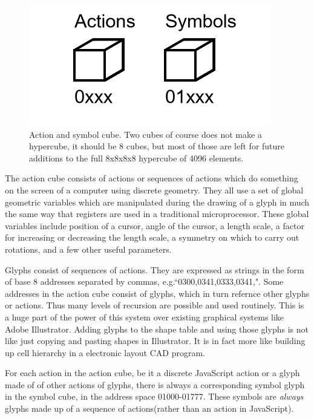 \documentclass[11pt]{article}
\begin{document}
\begin{figure}

\includegraphics[width=\linewidth]{figures/figure1_cubes.png}

\caption{Action and symbol cube. Two cubes of course does not make a hypercube, it should be 8 cubes, but most of those are left for future additions to the full 8x8x8x8 hypercube of 4096 elements.}
\end{figure}




    The action cube consists of actions or sequences of actions which do something on the screen of a computer using discrete geometry.  They all use a set of global geometric variables which are manipulated during the drawing of a glyph in much the same way that registers are used in a traditional microprocessor.  These global variables include position of a cursor, angle of the cursor, a length scale, a factor for increasing or decreasing the length scale, a symmetry on which to carry out rotations, and a few other useful parameters.   





    Glyphs consist of sequences of actions.  They are expressed as strings in the form of base 8 addresses separated by commas, e.g.``0300,0341,0333,0341,".  Some addresses in the action cube consist of glyphs, which in turn refernce other glyphs or actions.  Thus many levels of recursion are possible and used routinely.  This is a huge part of the power of this system over existing graphical systems like Adobe Illustrator.  Adding glyphs to the shape table and using those glyphs is not like just copying and pasting shapes in Illustrator.  It is in fact more like building up cell hierarchy in a electronic layout CAD program. 
    



    For each action in the action cube, be it a discrete JavaScript action or a glyph made of of other actions of glyphs, there is always a corresponding symbol glyph in the symbol cube, in the address space 01000-01777.  These symbols are \textit{
always} glyphs made up of a sequence of actions(rather than an action in JavaScript).  
\end{document}
